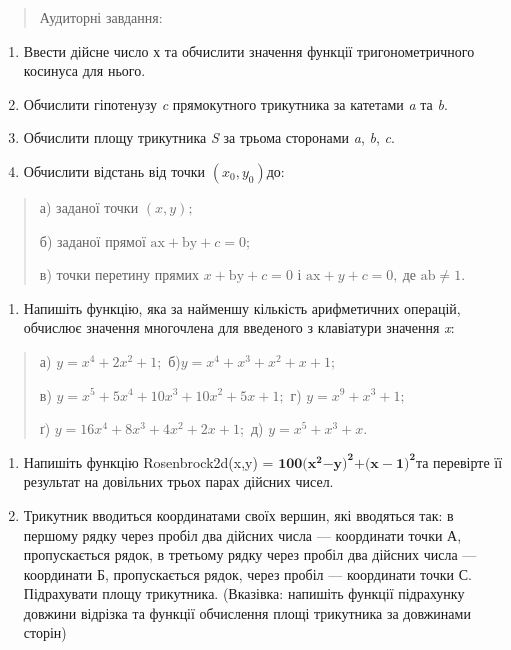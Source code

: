 \documentclass[]{article}
\begin{document}
\begin{quote}
Аудиторні завдання:
\end{quote}

\begin{enumerate}
\def\labelenumi{\arabic{enumi})}
\item
  Ввести дійсне число х та обчислити значення функції тригонометричного
  косинуса для нього.
\item
  Обчислити гіпотенузу \emph{c} прямокутного трикутника за катетами
  \emph{a} та \emph{b}.
\item
  Обчислити площу трикутника \emph{S} за трьома сторонами \emph{a},
  \emph{b}, \emph{c}.
\item
  Обчислити відстань від точки \((x_{0},y_{0})\)до:
\end{enumerate}

\begin{quote}
а) заданої точки \((x,y);\)

б) заданої прямої \(\mathrm{\text{ax}} + \mathrm{\text{by}} + c = 0\);

в) точки перетину прямих \(x + \mathrm{\text{by}} + c = 0\) і
\(\mathrm{\text{ax}} + y + c = 0,\ \)де
\(\mathrm{\text{ab}} \neq 1\mathrm{.}\)
\end{quote}

\begin{enumerate}
\def\labelenumi{\arabic{enumi})}
\item
  Напишіть функцію, яка за найменшу кількість арифметичних операцій,
  обчислює значення многочлена для введеного з клавіатури значення
  \emph{x}:
\end{enumerate}

\begin{quote}
а) \(y = x^{4} + 2x^{2} + 1;\) б)\(y = x^{4} + x^{3} + x^{2} + x + 1;\)

в)
\(y = x^{5} + 5x^{4} + \mathrm{10}x^{3} + \mathrm{10}x^{2} + 5x + 1;\)
г) \(y = x^{9} + x^{3} + 1;\)

ґ) \(y = \mathrm{16}x^{4} + 8x^{3} + 4x^{2} + 2x + 1;\) д)
\(y = x^{5} + x^{3} + x\mathrm{.}\)
\end{quote}

\begin{enumerate}
\def\labelenumi{\arabic{enumi})}
\item
  Напишіть функцію Rosenbrock2d(x,y) =
  \(\mathbf{100(}\mathbf{x}^{\mathbf{2}}\mathbf{- y}\mathbf{)}^{\mathbf{2}}\mathbf{+ (x - 1}\mathbf{)}^{\mathbf{2}}\)та
  перевірте її результат на довільних трьох парах дійсних чисел.
\item
  Трикутник вводиться координатами своїх вершин, які вводяться так: в
  першому рядку через пробіл два дійсних числа --- координати точки А,
  пропускається рядок, в третьому рядку через пробіл два дійсних числа
  --- координати Б, пропускається рядок, через пробіл --- координати
  точки С. Підрахувати площу трикутника. (Вказівка: напишіть функції
  підрахунку довжини відрізка та функції обчислення площі трикутника за
  довжинами сторін)
\end{enumerate}
\end{document}
